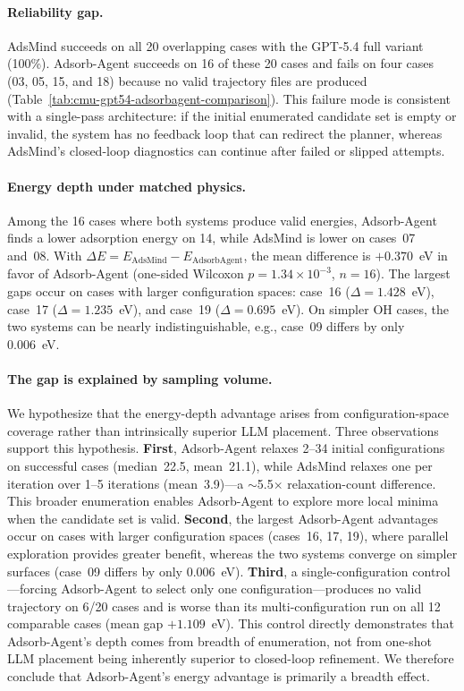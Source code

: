 \paragraph{Reliability gap.}
AdsMind succeeds on all 20 overlapping cases with the GPT-5.4 full variant (100\%).
Adsorb-Agent succeeds on 16 of these 20 cases and fails on four cases (03, 05, 15, and 18) because no valid trajectory files are produced (Table~\ref{tab:cmu-gpt54-adsorbagent-comparison}).
This failure mode is consistent with a single-pass architecture: if the initial enumerated candidate set is empty or invalid, the system has no feedback loop that can redirect the planner, whereas AdsMind's closed-loop diagnostics can continue after failed or slipped attempts.

\paragraph{Energy depth under matched physics.}
Among the 16 cases where both systems produce valid energies, Adsorb-Agent finds a lower adsorption energy on 14, while AdsMind is lower on cases~07 and~08.
With $\Delta E = E_{\mathrm{AdsMind}} - E_{\mathrm{AdsorbAgent}}$, the mean difference is $+0.370$~eV in favor of Adsorb-Agent (one-sided Wilcoxon $p = 1.34 \times 10^{-3}$, $n = 16$).
The largest gaps occur on cases with larger configuration spaces: case~16 ($\Delta = 1.428$~eV), case~17 ($\Delta = 1.235$~eV), and case~19 ($\Delta = 0.695$~eV).
On simpler OH cases, the two systems can be nearly indistinguishable, e.g., case~09 differs by only 0.006~eV.

\paragraph{The gap is explained by sampling volume.}
We hypothesize that the energy-depth advantage arises from configuration-space coverage rather than intrinsically superior LLM placement.
Three observations support this hypothesis.
\textbf{First}, Adsorb-Agent relaxes 2--34 initial configurations on successful cases (median~22.5, mean~21.1), while AdsMind relaxes one per iteration over 1--5 iterations (mean~3.9)---a $\sim$5.5$\times$ relaxation-count difference.
This broader enumeration enables Adsorb-Agent to explore more local minima when the candidate set is valid.
\textbf{Second}, the largest Adsorb-Agent advantages occur on cases with larger configuration spaces (cases~16, 17, 19), where parallel exploration provides greater benefit, whereas the two systems converge on simpler surfaces (case~09 differs by only 0.006~eV).
\textbf{Third}, a single-configuration control---forcing Adsorb-Agent to select only one configuration---produces no valid trajectory on 6/20 cases and is worse than its multi-configuration run on all 12 comparable cases (mean gap $+1.109$~eV).
This control directly demonstrates that Adsorb-Agent's depth comes from breadth of enumeration, not from one-shot LLM placement being inherently superior to closed-loop refinement.
We therefore conclude that Adsorb-Agent's energy advantage is primarily a breadth effect.

